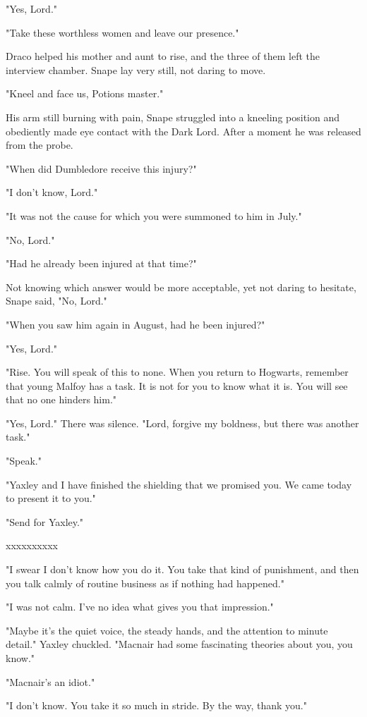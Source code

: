 \documentclass[a4paper,11pt]{article}
\begin{document}
"Yes, Lord."

"Take these worthless women and leave our presence."

Draco helped his mother and aunt to rise, and the three of them left the interview chamber. Snape lay very still, not daring to move.

"Kneel and face us, Potions master."

His arm still burning with pain, Snape struggled into a kneeling position and obediently made eye contact with the Dark Lord. After a moment he was released from the probe.

"When did Dumbledore receive this injury?"

"I don't know, Lord."

"It was not the cause for which you were summoned to him in July."

"No, Lord."

"Had he already been injured at that time?"

Not knowing which answer would be more acceptable, yet not daring to hesitate, Snape said, "No, Lord."

"When you saw him again in August, had he been injured?"

"Yes, Lord."

"Rise. You will speak of this to none. When you return to Hogwarts, remember that young Malfoy has a task. It is not for you to know what it is. You will see that no one hinders him."

"Yes, Lord." There was silence. "Lord, forgive my boldness, but there was another task."

"Speak."

"Yaxley and I have finished the shielding that we promised you. We came today to present it to you."

"Send for Yaxley."

xxxxxxxxxx

"I swear I don't know how you do it. You take that kind of punishment, and then you talk calmly of routine business as if nothing had happened."

"I was not calm. I've no idea what gives you that impression."

"Maybe it's the quiet voice, the steady hands, and the attention to minute detail." Yaxley chuckled. "Macnair had some fascinating theories about you, you know."

"Macnair's an idiot."

"I don't know. You take it so much in stride. By the way, thank you."
\end{document}
